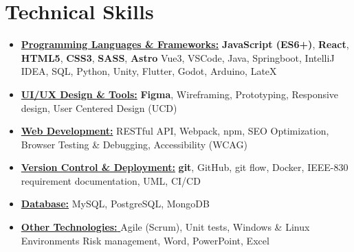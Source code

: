 \documentclass[11pt,a4paper,sans]{moderncv}
\newcommand{\sectionMargin}{-3mm}
\begin{document}
\section{Technical Skills}{
\begin{itemize}[label=\textbullet, noitemsep]
  \item {\underline{\textbf{Programming Languages \& Frameworks:}} 
    \textbf{JavaScript (ES6+)},
    \textbf{React},
    \textbf{HTML5},
    \textbf{CSS3},
    \textbf{SASS},
    \textbf{Astro}
    {Vue3},
    {VSCode},
    {Java},
    {Springboot},
    {IntelliJ IDEA},
    {SQL},
    {Python},
    {Unity},
    {Flutter},
    {Godot},
    {Arduino},
    {LateX}
  }
  \item {\underline{\textbf{UI/UX Design \& Tools:}}
    \textbf{Figma},
    {Wireframing},
    {Prototyping},
    {Responsive design},
    {User Centered Design (UCD)}
  }
  \item {\underline{\textbf{Web Development:}}
    {RESTful API},
    {Webpack},
    {npm},
    {SEO Optimization},
    {Browser Testing \& Debugging},
    {Accessibility (WCAG)}
  }
  \item {\underline{\textbf{Version Control \& Deployment:}}
    \textbf{git},
    {GitHub},
    {git flow},
    {Docker},
    {IEEE-830} requirement documentation,
    {UML},
    {CI/CD}
    }
  \item {\underline{\textbf{Database:}}
    {MySQL},
    {PostgreSQL},
    {MongoDB}
    }
  \item {\underline{\textbf{Other Technologies: }}
    {Agile (Scrum)},
    {Unit tests},
    {Windows \& Linux Environments}
    {Risk management},
    {Word},
    {PowerPoint},
    {Excel}
  }
\end{itemize}}

\vspace*{\sectionMargin}
\end{document}
